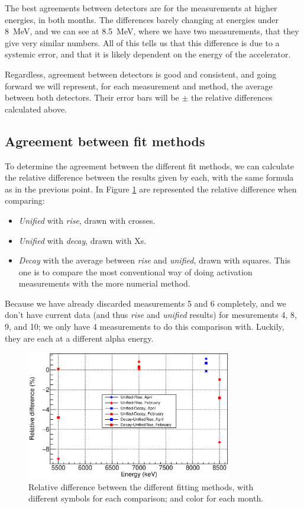 \documentclass[a4paper,12pt]{report}
\begin{document}
The best agreements between detectors are for the measurements at higher energies, in both months.
The differences barely changing at energies under \qty{8}{\MeV}, and we can see at \qty{8.5}{\MeV}, where we have two measurements, that they give very similar numbers.
All of this tells us that this difference is due to a systemic error, and that it is likely dependent on the energy of the accelerator.

Regardless, agreement between detectors is good and consistent, and going forward we will represent, for each measurement and method, the average between both detectors.
Their error bars will be $\pm$ the relative differences calculated above.

\subsection{Agreement between fit methods}
To determine the agreement between the different fit methods, we can calculate the relative difference between the results given by each, with the same formula as in the previous point.
In Figure \ref{activation_method_comparison} are represented the relative difference when comparing:
\begin{itemize}
	\item \textit{Unified} with \textit{rise}, drawn with crosses.
	\item \textit{Unified} with \textit{decay}, drawn with Xs.
	\item \textit{Decay} with the average between \textit{rise} and \textit{unified}, drawn with squares.
		This one is to compare the most conventional way of doing activation measurements with the more numerial method.
\end{itemize}
Because we have already discarded measurements 5 and 6 completely, and we don't have current data (and thus \textit{rise} and \textit{unified} results) for mesurements 4, 8, 9, and 10; we only have 4 measurements to do this comparison with.
Luckily, they are each at a different alpha energy.

\begin{figure}[H]
	\centering
	\includegraphics[width=0.80\textwidth]{activation_method_comparison.eps}
	\caption{Relative difference between the different fitting methods, with different symbols for each comparison; and color for each month.}
	\label{activation_method_comparison}
\end{figure}
\end{document}
